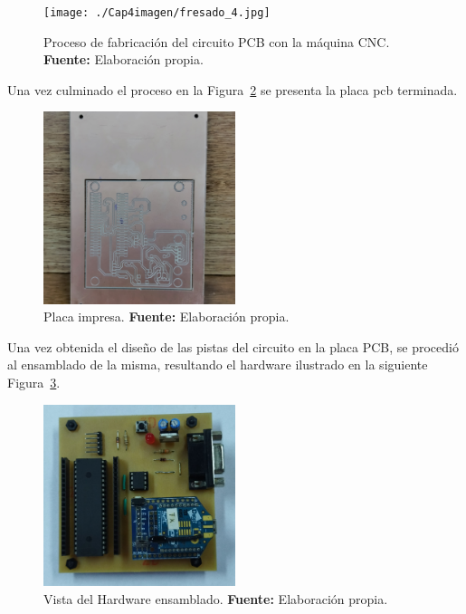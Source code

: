\begin{figure}[H]
	\centering
		\texttt{[image: ./Cap4imagen/fresado\_4.jpg]}
	\caption[Proceso de fabricación del circuito PCB con la máquina CNC.]{Proceso de fabricación del circuito PCB con la máquina CNC.\textbf{ Fuente:} Elaboración propia.}
	\label{Esch8} %
\end{figure}





Una vez culminado el proceso en la Figura~\ref{Esch9} se presenta la placa pcb terminada. 


\begin{figure}[H]
	\centering
	\includegraphics[width=0.5\textwidth]{./Cap4imagen/placa_pcb_4.jpg}
	\caption[Placa impresa.]{Placa impresa. \textbf{ Fuente:} Elaboración propia.}
	\label{Esch9} %
\end{figure}

Una vez obtenida el diseño de las pistas del circuito en la placa PCB, se procedió al ensamblado de la misma, resultando el hardware ilustrado en la siguiente Figura~\ref{Esch10}.


 
\begin{figure}[H]
	\centering
	\includegraphics[width=0.5\textwidth]{./Cap4imagen/cto_ensamblado_4.jpg}
	\caption[Vista del Hardware ensamblado.]{Vista del Hardware ensamblado.\textbf{ Fuente:} Elaboración propia.}
	\label{Esch10} %
\end{figure}



